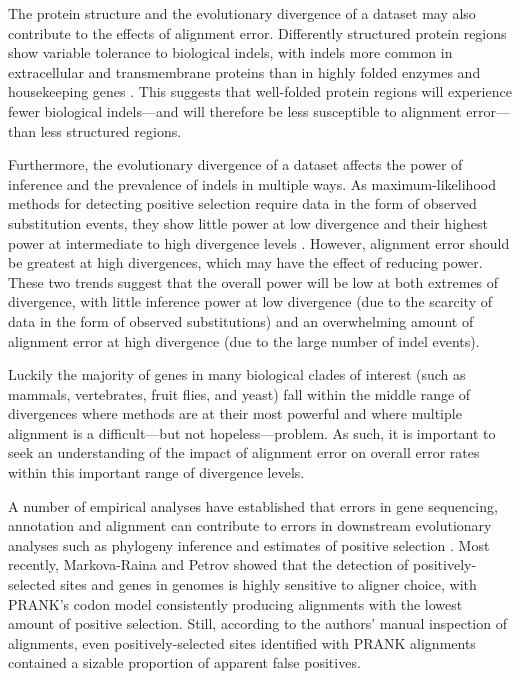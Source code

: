 \documentclass{article}
\begin{document}


The protein structure and the evolutionary divergence of a dataset may
also contribute to the effects of alignment error. Differently
structured protein regions show variable tolerance to biological
indels, with indels more common in extracellular and transmembrane
proteins than in highly folded enzymes and housekeeping genes
\citep{delaChaux2007DNA} . This suggests that well-folded protein
regions will experience fewer biological indels---and will therefore
be less susceptible to alignment error---than less structured
regions.

Furthermore, the evolutionary divergence of a dataset affects the
power of \sw inference and the prevalence of indels in multiple
ways. As maximum-likelihood methods for detecting positive selection
require data in the form of observed substitution events, they show
little power at low divergence and their highest power at intermediate
to high divergence levels \citep{Anisimova2001Accuracy}. However,
alignment error should be greatest at high divergences, which may have
the effect of reducing power. These two trends suggest that the
overall power will be low at both extremes of divergence, with little
inference power at low divergence (due to the scarcity of data in the
form of observed substitutions) and an overwhelming amount of
alignment error at high divergence (due to the large number of indel
events).

Luckily the majority of genes in many biological clades of interest
(such as mammals, vertebrates, fruit flies, and yeast) fall within the
middle range of divergences where \sw methods are at their most
powerful and where multiple alignment is a difficult---but not
hopeless---problem. As such, it is important to seek an understanding
of the impact of alignment error on overall error rates within this
important range of divergence levels.

A number of empirical analyses have established that errors in gene
sequencing, annotation and alignment can contribute to errors in
downstream evolutionary analyses such as phylogeny inference
\citep{Wong2008Alignment} and estimates of positive selection
\citep{Schneider2009Estimates,Markova-Raina2011High}. Most recently,
Markova-Raina and Petrov \citeyearpar{Markova-Raina2011High} showed
that the detection of positively-selected sites and genes in \Dr
genomes is highly sensitive to aligner choice, with PRANK's codon
model \citep{Loytynoja2008PhylogenyAware} consistently producing
alignments with the lowest amount of positive selection. Still,
according to the authors' manual inspection of alignments, even
positively-selected sites identified with PRANK alignments contained a
sizable proportion of apparent false positives.
\end{document}

